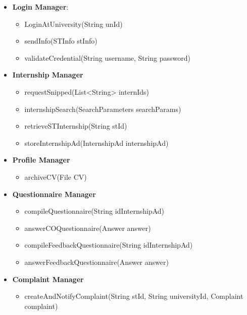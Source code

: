 \begin{itemize}
      \item \textbf{Login Manager}:
          \begin{itemize}
              \item LoginAtUniversity(String unId)
              \item sendInfo(STInfo stInfo)
              \item validateCredential(String username, String password)
          \end{itemize}
  
      \item \textbf{Internship Manager}
          \begin{itemize}
              \item requestSnipped(List<String> internIds)
              \item internshipSearch(SearchParameters searchParams)
              \item retrieveSTInternship(String stId)
              \item storeInternshipAd(InternshipAd internshipAd)
          \end{itemize}
  
      \item \textbf{Profile Manager}
          \begin{itemize}
              \item archiveCV(File CV)
          \end{itemize}
      
      \item \textbf{Questionnaire Manager}
          \begin{itemize}
              \item compileQuestionnaire(String idInternshipAd)
              \item answerCOQuestionnaire(Answer answer)
              \item compileFeedbackQuestionnaire(String idInternshipAd)
              \item answerFeedbackQuestionnaire(Answer answer)
          \end{itemize}
  
      \item \textbf{Complaint Manager}
          \begin{itemize}
              \item createAndNotifyComplaint(String stId, String universityId, Complaint complaint)
          \end{itemize}
  

\end{itemize}
